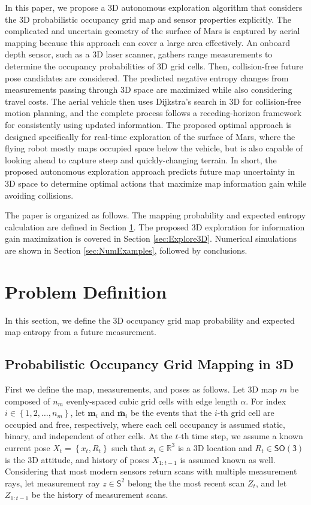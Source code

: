 \documentclass[conf]{new-aiaa}
\newcommand{\braces}[1]{\ensuremath{\left\{ #1 \right\}}}
\newcommand{\SO}{\ensuremath{\mathsf{SO(3)}}}
\renewcommand{\Re}{\ensuremath{\mathbb{R}}}
\newcommand{\Sph}{\ensuremath{\mathsf{S}}}
\begin{document}
In this paper, we propose a 3D autonomous exploration algorithm that considers the 3D probabilistic occupancy grid map and sensor properties explicitly. The complicated and uncertain geometry of the surface of Mars is captured by aerial mapping because this approach can cover a large area effectively. An onboard depth sensor, such as a 3D laser scanner, gathers range measurements to determine the occupancy probabilities of 3D grid cells. Then, collision-free future pose candidates are considered. The predicted negative entropy changes from measurements passing through 3D space are maximized while also considering travel costs. The aerial vehicle then uses Dijkstra's search in 3D for collision-free motion planning, and the complete process follows a receding-horizon framework for consistently using updated information. The proposed optimal approach is designed specifically for real-time exploration of the surface of Mars, where the flying robot mostly maps occupied space below the vehicle, but is also capable of looking ahead to capture steep and quickly-changing terrain. In short, the proposed autonomous exploration approach predicts future map uncertainty in 3D space to determine optimal actions that maximize map information gain while avoiding collisions.

The paper is organized as follows. The mapping probability and expected entropy calculation are defined in Section \ref{sec:ProbDef}. The proposed 3D exploration for information gain maximization is covered in Section \ref{sec:Explore3D}. Numerical simulations are shown in Section \ref{sec:NumExamples}, followed by conclusions.

\section{Problem Definition}
\label{sec:ProbDef}

In this section, we define the 3D occupancy grid map probability and expected map entropy from a future measurement.

\subsection{Probabilistic Occupancy Grid Mapping in 3D}

First we define the map, measurements, and poses as follows. Let 3D map $ m$ be composed of $n_m$ evenly-spaced cubic grid cells with edge length $\alpha$. For index $i\in\braces{1,2,\ldots,n_m}$, let $\mathbf{m}_i$ and $\bar{\mathbf{m}}_i$ be the events that the $i$-th grid cell are occupied and free, respectively, where each cell occupancy is assumed static, binary, and independent of other cells. At the $t$-th time step, we assume a known current pose $X_t=\braces{x_t,R_t}$ such that $x_t\in\Re^3$ is a 3D location and $R_t\in\SO$ is the 3D attitude, and history of poses $X_{1:t-1}$ is assumed known as well. Considering that most modern sensors return scans with multiple measurement rays, let measurement ray $z\in\Sph^2$ belong the the most recent scan $Z_t$, and let $Z_{1:t-1}$ be the history of measurement scans.
\end{document}
